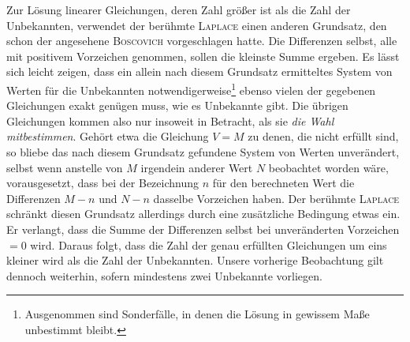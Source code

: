 Zur Lösung linearer Gleichungen, deren Zahl größer ist als die Zahl der Unbekannten, verwendet der berühmte \textsc{Laplace} einen anderen Grundsatz, den schon der angesehene \textsc{Boscovich} vorgeschlagen hatte. Die Differenzen selbst, alle mit positivem Vorzeichen genommen, sollen die kleinste Summe ergeben. Es lässt sich leicht zeigen, dass ein allein nach diesem Grundsatz ermitteltes System von Werten für die Unbekannten notwendigerweise\footnote{Ausgenommen sind Sonderfälle, in denen die Lösung in gewissem Maße unbestimmt bleibt.} ebenso vielen der gegebenen Gleichungen exakt genügen muss, wie es Unbekannte gibt. Die übrigen Gleichungen kommen also nur insoweit in Betracht, als sie \emph{die Wahl mitbestimmen}. Gehört etwa die Gleichung $V=M$ zu denen, die nicht erfüllt sind, so bliebe das nach diesem Grundsatz gefundene System von Werten unverändert, selbst wenn anstelle von $M$ irgendein anderer Wert $N$ beobachtet worden wäre, vorausgesetzt, dass bei der Bezeichnung $n$ für den berechneten Wert die Differenzen $M-n$ und $N-n$ dasselbe Vorzeichen haben. Der berühmte \textsc{Laplace} schränkt diesen Grundsatz allerdings durch eine zusätzliche Bedingung etwas ein. Er verlangt, dass die Summe der Differenzen selbst bei unveränderten Vorzeichen $=0$ wird. Daraus folgt, dass die Zahl der genau erfüllten Gleichungen um eins kleiner wird als die Zahl der Unbekannten. Unsere vorherige Beobachtung gilt dennoch weiterhin, sofern mindestens zwei Unbekannte vorliegen.
